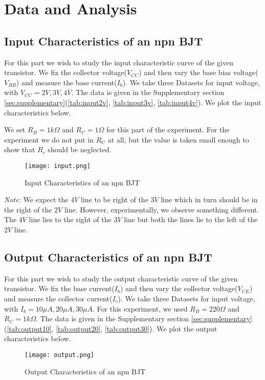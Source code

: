 \documentclass{scrartcl}
\newcommand{\1}{\mathbbm{1}}
\begin{document}

\section{Data and Analysis}
\subsection{Input Characteristics of an npn BJT}
For this part we wish to study the input characteristic curve of the given transistor. We fix the collector voltage($V_{CC}$) and then vary
the base bias voltage($V_{BB}$) and measure the base current($I_b$). We take three Datasets for input voltage, with $V_{CC} = 2V, 3V, 4V$. The data is 
given in the Supplementary section \cref{sec:supplementary}(\cref{tab:input2v}, \cref{tab:input3v}, \cref{tab:input4v}). We plot the input characteristics below.

We set $R_B = 1 k \Omega$ and $R_C = 1 \Omega$ for this part of the experiment. For the experiment we do not put in $R_C$ at all, but the value is taken 
small enough to show that $R_c$ should be neglected.
\begin{figure}[H]
        \centering
        \texttt{[image: input.png]}
        \caption{Input Characteristics of an npn BJT}
\end{figure}
\emph{Note:} We expect the $4V$ line to be right of the $3V$ line which in turn should be in the right of the $2V$ line. However, experimentally, 
we observe something different. The $4V$ line lies to the right of the $3V$ line but both the lines lie to the left of the $2V$ line.
\subsection{Output Characteristics of an npn BJT}
For this part we wish to study the output characteristic curve of the given transistor. We fix the base current($I_b$) and then vary the collector voltage($V_{CE}$) and measure the collector current($I_c$). We take three 
 Datasets for input voltage, with $I_b = 10 \mu A, 20 \mu A, 30 \mu A$. For this experiment, we used $R_B = 220 \Omega$ and $R_C = 1 k\Omega$. The data is
 given in the Supplementary section \cref{sec:supplementary}(\cref{tab:output10}, \cref{tab:output20}, \cref{tab:output30}). We plot the output characteristics below.
\begin{figure}[h]
        \centering
        \texttt{[image: output.png]}
        \caption{Output Characteristics of an npn BJT}
\end{figure}
\end{document}
